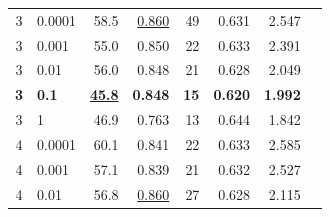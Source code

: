 \documentclass[12pt]{jarticle}
\numberwithin{equation}{section}    %
\numberwithin{figure}{section}      %
\numberwithin{table}{section}      %
\begin{document}
\begin{table}[bt]
\begin{center}
{\begin{tabular}{|c|l|rrrrrr|}
                \hline
                3                        & 0.0001                                   & 58.5                         & \underline{0.860}         & 49                         & 0.631                         & 2.547                             &                                    \\
                3                        & 0.001                                    & 55.0                         & 0.850                     & 22                         & 0.633                         & 2.391                             &                                    \\
                3                        & 0.01                                     & 56.0                         & 0.848                     & 21                         & 0.628                         & 2.049                             &                                    \\
                \textbf{3}               & \textbf{0.1}                             & \underline{\textbf{45.8}}    & \textbf{0.848}            & \textbf{15}                & \textbf{0.620}                & \textbf{1.992}                    &                                    \\
                3                        & 1                                        & 46.9                         & 0.763                     & 13                         & 0.644                         & 1.842                             &                                    \\
                \hline
                4                        & 0.0001                                   & 60.1                         & 0.841                     & 22                         & 0.633                         & 2.585                             &                                    \\
                4                        & 0.001                                    & 57.1                         & 0.839                     & 21                         & 0.632                         & 2.527                             &                                    \\
                4                        & 0.01                                     & 56.8                         & \underline{0.860}         & 27                         & 0.628                         & 2.115                             &                                    \\

\end{tabular}}
\end{center}
\end{table}
\end{document}
